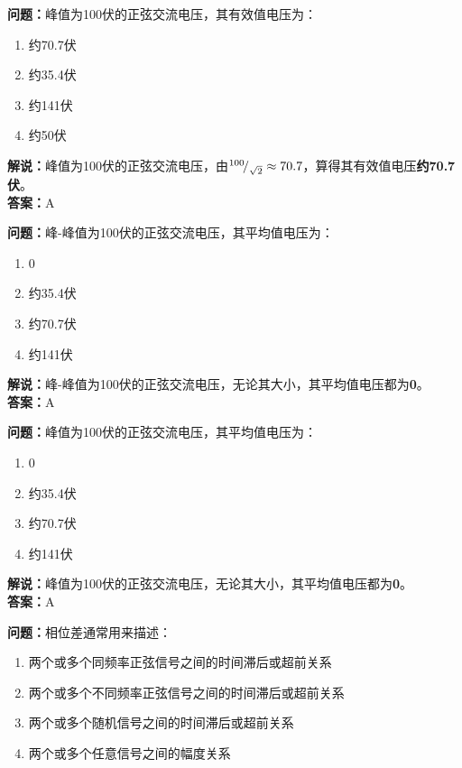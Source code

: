 \textbf{问题：}峰值为100伏的正弦交流电压，其有效值电压为：

\begin{enumerate}[label=\Alph*), leftmargin=1.5cm]
	\item 约70.7伏
	\item 约35.4伏
	\item 约141伏
	\item 约50伏
\end{enumerate}

\textbf{解说：}峰值为100伏的正弦交流电压，由\({}^{100}\!/_{\sqrt{2}}\approx70.7\)，算得其有效值电压\textbf{约70.7伏}。\\\textbf{答案：}A



\textbf{问题：}峰-峰值为100伏的正弦交流电压，其平均值电压为：

\begin{enumerate}[label=\Alph*), leftmargin=1.5cm]
	\item 0
	\item 约35.4伏
	\item 约70.7伏
	\item 约141伏
\end{enumerate}

\textbf{解说：}峰-峰值为100伏的正弦交流电压，无论其大小，其平均值电压都为\textbf{0}。\\\textbf{答案：}A



\textbf{问题：}峰值为100伏的正弦交流电压，其平均值电压为：

\begin{enumerate}[label=\Alph*), leftmargin=1.5cm]
	\item 0
	\item 约35.4伏
	\item 约70.7伏
	\item 约141伏
\end{enumerate}

\textbf{解说：}峰值为100伏的正弦交流电压，无论其大小，其平均值电压都为\textbf{0}。\\\textbf{答案：}A



\textbf{问题：}相位差通常用来描述：

\begin{enumerate}[label=\Alph*), leftmargin=1.5cm]
	\item 两个或多个同频率正弦信号之间的时间滞后或超前关系
	\item 两个或多个不同频率正弦信号之间的时间滞后或超前关系
	\item 两个或多个随机信号之间的时间滞后或超前关系
	\item 两个或多个任意信号之间的幅度关系
\end{enumerate}

